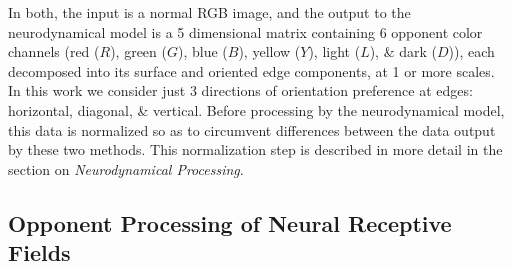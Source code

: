 \documentclass[journal,onecolumn]{IEEEtran}
\begin{document}
In both, the input is a normal RGB image, and the output to the neurodynamical model is a 5 dimensional matrix containing 6 opponent color channels (red ($R$), green ($G$), blue ($B$), yellow ($Y$), light ($L$), \& dark ($D$)), each decomposed into its surface and oriented edge components, at 1 or more scales. In this work we consider just 3 directions of orientation preference at edges: horizontal, diagonal, \& vertical. Before processing by the neurodynamical model, this data is normalized so as to circumvent differences between the data output by these two methods. This normalization step is described in more detail in the section on \textit{Neurodynamical Processing}.

\subsection{Opponent Processing of Neural Receptive Fields}
\end{document}

